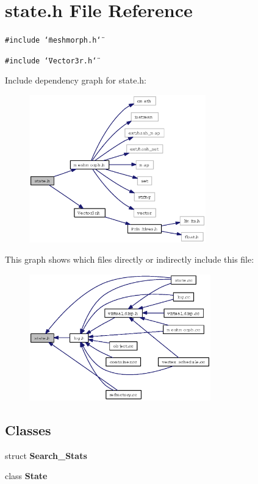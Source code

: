\section{state.h File Reference}
\label{state_8h}
{\tt \#include \char`\"{}meshmorph.h\char`\"{}}\par
{\tt \#include \char`\"{}Vector3r.h\char`\"{}}\par


Include dependency graph for state.h:\begin{figure}[H]
\begin{center}
\leavevmode
\includegraphics[width=217pt]{state_8h__incl}
\end{center}
\end{figure}


This graph shows which files directly or indirectly include this file:\begin{figure}[H]
\begin{center}
\leavevmode
\includegraphics[width=223pt]{state_8h__dep__incl}
\end{center}
\end{figure}
\subsection*{Classes}
\begin{CompactItemize}
\item 
struct {\bf Search\_\-Stats}
\item 
class {\bf State}
\end{CompactItemize}
